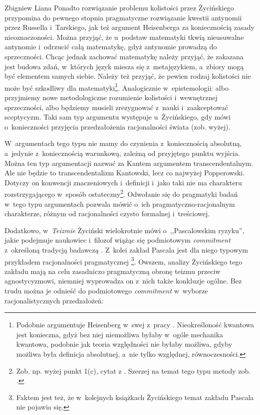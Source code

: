 \begin{artplenv}{Zbigniew Liana}
Ponadto rozwiązanie problemu kolistości przez Życińskiego przypomina do pewnego stopnia pragmatyczne rozwiązanie kwestii antynomii przez Russella i~Tarskiego, jak też argument Heisenberga za koniecznością zasady nieoznaczoności. Można przyjąć, że u~podstaw matematyki tkwią nieusuwalne antynomie i~odrzucić całą matematykę, gdyż antynomie prowadzą do sprzeczności. Chcąc jednak zachować matematykę należy przyjąć, że zakazana jest budowa zdań, w~których język miesza się z~metajęzykiem, a~zbiory mogą być elementem samych siebie. Należy też przyjąć, że pewien rodzaj kolistości nie może być szkodliwy dla matematyki\footnote{Podobnie argumentuje Heisenberg w~swej z~pracy
\parencite*[][s.~179n]{heisenberg_uber_1927}. %
 Nieokreśloność kwantowa jest konieczna, gdyż bez niej niemożliwa byłaby w~ogóle mechanika kwantowa, podobnie jak teoria względności nie byłaby możliwa, gdyby możliwa była definicja absolutnej, a~nie tylko względnej, równoczesności.}. Analogicznie w~epistemologii: albo przyjmiemy nowe metodologiczne rozumienie kolistości i~wewnętrznej sprzeczności, albo będziemy musieli zrezygnować z~nauki i~zaakceptować sceptycyzm. Taki sam typ argumentu występuje u~Życińskiego, gdy mówi o~konieczności przyjęcia przedzałożenia racjonalności świata (zob. wyżej).

W~argumentach tego typu nie mamy do czynienia z~koniecznością absolutną, a~jedynie z~koniecznością warunkową, zależną od przyjętego punktu wyjścia. Można ten typ argumentacji nazwać za Kantem argumentem transcendentalnym. Ale nie będzie to transcendentalizm Kantowski, lecz co najwyżej Popperowski. Dotyczy on konwencji znaczeniowych i~definicji i~jako taki nie ma charakteru rozstrzygającego w~sposób ostateczny\footnote{Zob. np. wyżej punkt 1(c), cytat z
\parencite[][s.~79]{zycinski_teizm_1985}. %
 Szerzej na temat tego typu metody zob. 
\parencite[][s.~153n]{liana_nauka_2019_liana}.%
}. Odwołanie się do pragmatyki badań w~tego typu argumentach pozwala mówić o~ich pragmatyczno-racjonalnym charakterze, różnym od racjonalności czysto formalnej i~treściowej.

Dodatkowo, w~\textit{Teizmie} Życiński wielokrotnie mówi o~,,Pascalowskim ryzyku'', jakie podejmuje naukowiec i~filozof wiążąc się podmiotowym \textit{commitment} z~określoną tradycją badawczą
\parencite[][s.~135.86.228.230]{zycinski_teizm_1985}. %
 Z~kolei zakład Pascala jest dla niego typowym przykładem racjonalności pragmatycznej 
\parencite[][s.~207nn]{zycinski_teizm_1985}%
\footnote{Faktem jest też, że w~kolejnych książkach Życińskiego temat zakładu Pascala nie pojawia się.}. Owszem, analizy Życińskiego tego zakładu mają na celu zasadniczo pragmatyczną obronę teizmu przeciw agnostycyzmowi, niemniej wyprowadza on z~nich także konkluzje ogólne. Bez trudu można je odnieść do podmiotowego \textit{commitment} w~wyborze racjonalistycznych przedzałożeń:


\end{artplenv}
